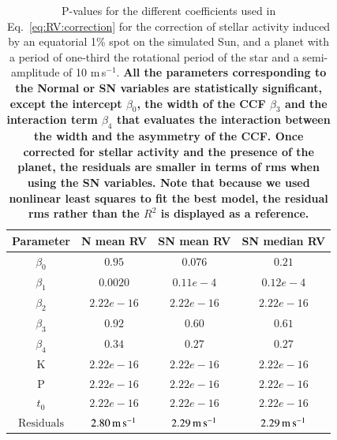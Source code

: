 \documentclass{aa}
\def\ms{\hbox{\,m\,s$^{-1}$}}         %
\begin{document}
\begin{table}
\begin{center}
\caption{P-values for the different coefficients used in Eq.~\eqref{eq:RV:correction} for the correction of stellar activity induced by an equatorial 1\% spot on the simulated Sun, and a planet with a period of one-third the rotational period of the star and a semi-amplitude  of 10\,\ms. {\bf All the parameters corresponding to the Normal or SN variables are statistically significant, except the intercept $\beta_0$, the width of the CCF $\beta_3$ and the interaction term $\beta_4$ that evaluates the interaction between the width and the asymmetry of the CCF. Once corrected for stellar activity and the presence of the planet, the residuals are smaller in terms of rms when using the SN variables. Note that because we used nonlinear least squares to fit the best model, the residual rms rather than the $R^2$ is displayed as a reference.}}
\label{table:spotplanet.test}
\begin{tabular}{|c|c|c|c|}
\hline
Parameter          & N mean RV         &   SN mean RV &   SN median RV \\
\hline
$\beta_{0}$            &    $0.95$    & $0.076$  & $0.21$ \\
\hline
$\beta_{1}$            &    $0.0020$    & $0.11e-4$  & $0.12e-4$ \\
\hline
$\beta_{2}$            &     $2.22e-16$   & $2.22e-16$ & $2.22e-16$\\
\hline
$\beta_{3}$            &     $0.92$   &  $0.60$  & $0.61$\\
\hline
$\beta_{4}$            &     $0.34$   &  $0.27$ & $0.27$\\
\hline
K            &     $2.22e-16$   &  $2.22e-16$   & $2.22e-16$ \\
\hline
P            &     $2.22e-16$   &  $2.22e-16$ & $2.22e-16$ \\
\hline
$t_{0}$            &     $2.22e-16$   &  $2.22e-16$ & $2.22e-16$ \\
\hline
$\text{Residuals}$      &     $2.80 \ms$    &  $ 2.29 \ms$ & $2.29 \ms$  \\
\hline
\end{tabular}
\end{center}
\end{table}
\end{document}
